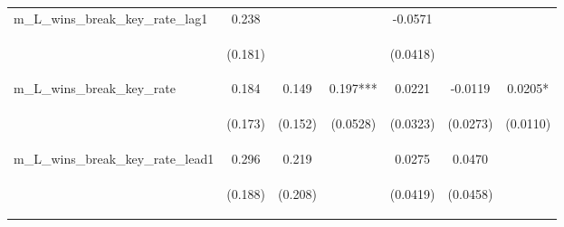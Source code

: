 \begin{tabular}{lcccccc}
m\_L\_wins\_break\_key\_rate\_lag1 & 0.238 &  &  & -0.0571 &  &  \\
\vspace{4pt} & \begin{footnotesize}(0.181)\end{footnotesize} & \begin{footnotesize}\end{footnotesize} & \begin{footnotesize}\end{footnotesize} & \begin{footnotesize}(0.0418)\end{footnotesize} & \begin{footnotesize}\end{footnotesize} & \begin{footnotesize}\end{footnotesize} \\
m\_L\_wins\_break\_key\_rate & 0.184 & 0.149 & 0.197*** & 0.0221 & -0.0119 & 0.0205* \\
\vspace{4pt} & \begin{footnotesize}(0.173)\end{footnotesize} & \begin{footnotesize}(0.152)\end{footnotesize} & \begin{footnotesize}(0.0528)\end{footnotesize} & \begin{footnotesize}(0.0323)\end{footnotesize} & \begin{footnotesize}(0.0273)\end{footnotesize} & \begin{footnotesize}(0.0110)\end{footnotesize} \\
m\_L\_wins\_break\_key\_rate\_lead1 & 0.296 & 0.219 &  & 0.0275 & 0.0470 &  \\
\vspace{4pt} & \begin{footnotesize}(0.188)\end{footnotesize} & \begin{footnotesize}(0.208)\end{footnotesize} & \begin{footnotesize}\end{footnotesize} & \begin{footnotesize}(0.0419)\end{footnotesize} & \begin{footnotesize}(0.0458)\end{footnotesize} & \begin{footnotesize}\end{footnotesize} \\

\end{tabular}
